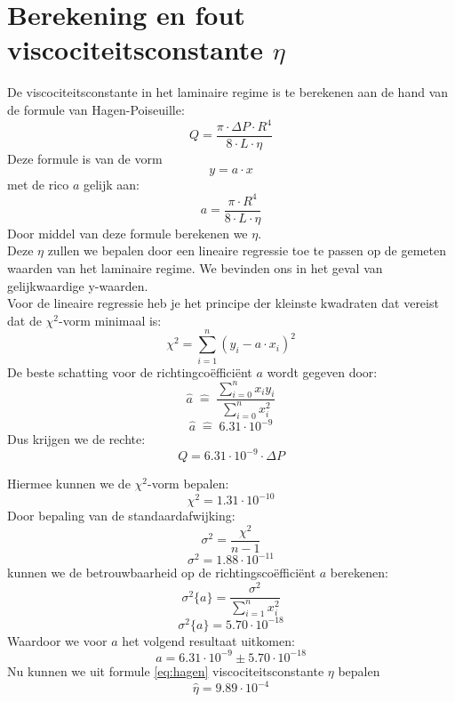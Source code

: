 \section{Berekening en fout viscociteitsconstante $\eta$}

De viscociteitsconstante in het laminaire regime is te berekenen aan de hand van de formule van Hagen-Poiseuille:
\begin{equation}
    \label{eq:hagen}
    Q = \frac{\pi \cdot \Delta P \cdot R^4}{8 \cdot L \cdot \eta}
\end{equation}
Deze formule is van de vorm $$y=a\cdot x$$ met de rico $a$ gelijk aan: $$a = \frac{\pi \cdot R^4}{8 \cdot L \cdot \eta}$$
Door middel van deze formule berekenen we $\eta$. \\

Deze $\eta$ zullen we bepalen door een lineaire regressie toe te passen op de gemeten waarden van het laminaire regime.
We bevinden ons in het geval van gelijkwaardige y-waarden.\\

Voor de lineaire regressie heb je het principe der kleinste kwadraten dat vereist
dat de $\chi ^2$-vorm minimaal is: 
\begin{equation}
    \chi ^2 = \sum\limits_{i=1}^n(y_i-a\cdot x_i)^2
\end{equation}
De beste schatting voor de richtingcoëfficiënt $a$ wordt gegeven door:
\begin{equation}
    \label{eq:a}
    \hat{a} \; \hat{=} \;\frac{\sum\limits_{i=0}^n x_i  y_i}{\sum\limits_{i=0}^n x_i^2}
\end{equation}
\begin{equation*}
    \hat{a} \; \hat{=} \; 6.31 \cdot 10^{-9}
\end{equation*}
Dus krijgen we de rechte: $$Q = 6.31\cdot 10^{-9} \cdot \Delta P$$

Hiermee kunnen we de $\chi ^2$-vorm bepalen:
\begin{equation*}
    \chi ^2 = 1.31 \cdot 10^{-10}
\end{equation*}
Door bepaling van de standaardafwijking: 
\begin{equation}
    \sigma ^2 = \frac{\chi ^2}{n - 1}
\end{equation}
\begin{equation*}
    \sigma ^2 = 1.88 \cdot 10^{-11}
\end{equation*}
kunnen we de betrouwbaarheid op de richtingscoëfficiënt $a$ berekenen: 
\begin{equation}
    \label{eq:sa}
    \sigma ^2 \{ a \} = \frac{\sigma ^2}{\sum\limits_{i=1}^n x_i^2}
\end{equation}
\begin{equation*}
    \sigma ^2 \{ a \} =  5.70 \cdot 10^{-18}
\end{equation*}
Waardoor we voor $a$ het volgend resultaat uitkomen:
$$a = 6.31 \cdot 10^{-9} \pm 5.70 \cdot 10^{-18}$$
Nu kunnen we uit formule \eqref{eq:hagen} viscociteitsconstante $\eta$ bepalen
\begin{equation*}
    \hat{\eta} = 9.89 \cdot 10^{-4}
\end{equation*}

